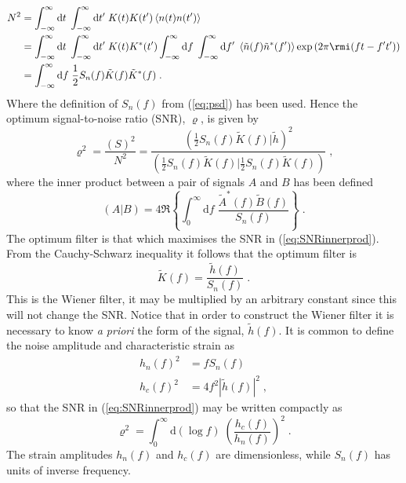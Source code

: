 \begin{eqnarray} 
N^{2}&=\int_{-\infty}^{\infty}\mathrm{d}t\;\int_{-\infty}^{\infty}\mathrm{d}t'\;K(t)K(t')\left<n(t)n(t')\right> \nonumber \\
&=\int_{-\infty}^{\infty}\mathrm{d}t\;\int_{-\infty}^{\infty}\mathrm{d}t'\;K(t)K^{*}(t')\int_{-\infty}^{\infty}\mathrm{d}f\;\int_{-\infty}^{\infty}\mathrm{d}f'\;\left<\tilde{n}(f)\tilde{n}^{*}(f')\right>\exp\left(2\pi\rmi(ft-f't')\right)\nonumber \\
&=\int_{-\infty}^{\infty}\mathrm{d}f \; \frac{1}{2}S_{n}(f)\tilde{K}(f)\tilde{K}^{*}(f) \; .
 \end{eqnarray}
Where the definition of $S_{n}(f)$ from (\ref{eq:psd}) has been used. Hence the optimum signal-to-noise ratio (SNR), $\varrho$, is given by
\begin{equation}\label{eq:SNRinnerprod} 
\varrho^{2}= \frac{(S)^{2}}{N^{2}}= \frac{\left( \frac{1}{2}S_{n}(f)\tilde{K}(f) \Big| \tilde{h} \right)^{2}}{\left( \frac{1}{2}S_{n}(f)\tilde{K}(f) \Big| \frac{1}{2}S_{n}(f)\tilde{K}(f) \right)} \;,
\end{equation}
where the inner product between a pair of signals $A$ and $B$ has been defined
\begin{equation}\label{eq:snrinnerprod} \left( A | B \right) = 4\Re\left\{\int_{0}^{\infty}\mathrm{d}f\;\frac{\tilde{A}^{*}(f)\tilde{B}(f)}{S_{n}(f)}\right\} \; .\end{equation}
The optimum filter is that which maximises the SNR in (\ref{eq:SNRinnerprod}). From the Cauchy-Schwarz inequality it follows that the optimum filter is
\begin{equation} \tilde{K}(f)=\frac{\tilde{h}(f)}{S_{n}(f)} \; . \end{equation}
This is the Wiener filter, it may be multiplied by an arbitrary constant since this will not change the SNR. Notice that in order to construct the Wiener filter it is necessary to know \emph{a priori} the form of the signal, $\tilde{h}(f)$. It is common to define the noise amplitude and characteristic strain as
\begin{eqnarray}\label{eq:strains} h_{n}(f)^{2}&=fS_{n}(f) \\
\label{eq:strains1} \label{eq:strainsagain}               h_{c}(f)^{2}&=4f^{2}\left| \tilde{h}(f) \right|^{2} \; , \end{eqnarray}
so that the SNR in (\ref{eq:SNRinnerprod}) may be written compactly as
\begin{equation}\label{eq:hc} 
\varrho^{2}=\int_{0}^{\infty} \mathrm{d}\left(\log f\right)\; \left(\frac{h_{c}(f)}{h_{n}(f)}\right)^{2} \;.
\end{equation}
The strain amplitudes $h_{n}(f)$ and $h_{c}(f)$ are dimensionless, while $S_{n}(f)$ has units of inverse frequency.

